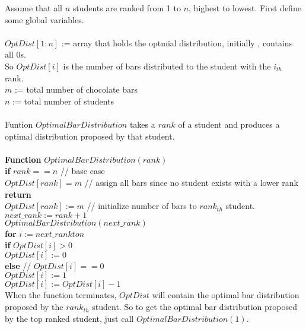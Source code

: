 \documentclass[11pt]{article}
\begin{document}
Assume that all $n$ students are ranked from 1 to $n$, highest to
lowest. First define some global variables.\\\\ 
$OptDist[1:n]$ := array that holds the optmial distribution, initially
, contains all 0s.\\
So $OptDist[i]$ is the number of bars distributed to the student with
the $i_{th}$ rank.\\
$m$ := total number of chocolate bars\\
$n$ := total number of students\\\\
Funtion $OptimalBarDistribution$ takes a $rank$ of a student
and produces a optimal distribution proposed by that student.\\\\
\textbf{Function} $OptimalBarDistribution( rank )$\\
\-\hspace{2em} \textbf{if} $rank == n$ // base case \\
\-\hspace{4em} $OptDist[rank] = m$ // assign all bars since no student
exists with a lower rank \\
\-\hspace{4em} \textbf{return}\\
\-\hspace{2em} $OptDist[rank] := m$ // initialize number of bars to
$rank_{th}$ student.\\
\-\hspace{2em} $next\_rank := rank+1$\\
\-\hspace{2em} $OptimalBarDistribution( next\_rank )$\\
\-\hspace{2em} \textbf{for} $i := next\_rank to n$\\
\-\hspace{4em} \textbf{if} $OptDist[i] > 0$\\
\-\hspace{6em} $OptDist[i] := 0$\\
\-\hspace{4em} \textbf{else} // $OptDist[i] == 0$\\
\-\hspace{6em} $OptDist[i] := 1$\\
\-\hspace{6em} $OptDist[i] := OptDist[i] - 1$\\

When the function terminates, $OptDist$ will contain the optimal bar
distribution proposed by the $rank_{th}$ student. So to get the
optimal bar distribution proposed by the top ranked student, just call
$OptimalBarDistribution(1)$.
\end{document}
